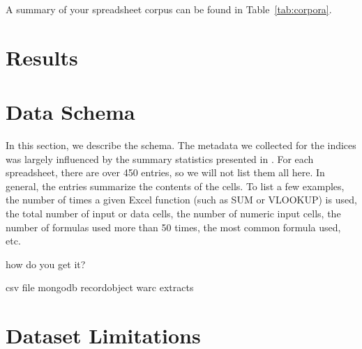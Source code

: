 \documentclass[conference]{IEEEtran}
\begin{document}
A summary of your spreadsheet corpus can be found in Table~\ref{tab:corpora}.

\section{Results}


\section{Data Schema}
\label{sec:schema}
In this section, we describe the schema.
The metadata we collected for the indices was largely influenced by the summary statistics presented in \cite{Fisher2005}.  
For each spreadsheet, there are over 450 entries, so we will not list them all here.
In general, the entries summarize the contents of the cells.
To list a few examples, the number of times a given Excel function (such as SUM or VLOOKUP) is used, the total number of input or data cells, the number of numeric input cells, the number of formulas used more than 50 times, the most common formula used, etc.



how do you get it?

csv file
mongodb recordobject warc extracts




\section{Dataset Limitations}




\end{document}
